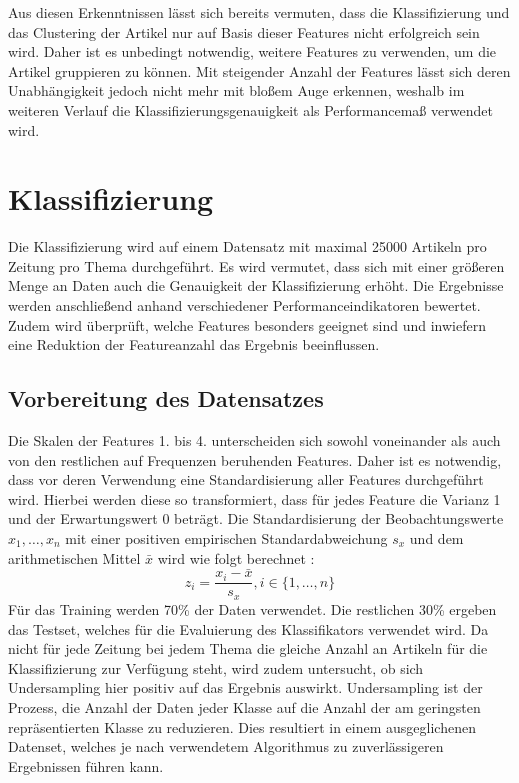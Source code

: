 Aus diesen Erkenntnissen lässt sich bereits vermuten, dass die Klassifizierung und das Clustering der Artikel nur auf Basis dieser Features nicht erfolgreich sein wird. Daher ist es unbedingt notwendig, weitere Features zu verwenden, um die Artikel gruppieren zu können. Mit steigender Anzahl der Features lässt sich deren Unabhängigkeit jedoch nicht mehr mit bloßem Auge erkennen, weshalb im weiteren Verlauf die Klassifizierungsgenauigkeit als Performancemaß verwendet wird.

\section{Klassifizierung}
Die Klassifizierung wird auf einem Datensatz mit maximal 25000 Artikeln pro Zeitung pro Thema durchgeführt. Es wird vermutet, dass sich mit einer größeren Menge an Daten auch die Genauigkeit der Klassifizierung erhöht. Die Ergebnisse werden anschließend anhand verschiedener Performanceindikatoren bewertet. Zudem wird überprüft, welche Features besonders geeignet sind und inwiefern eine Reduktion der Featureanzahl das Ergebnis beeinflussen.

\subsection{Vorbereitung des Datensatzes}
Die Skalen der Features 1. bis 4. unterscheiden sich sowohl voneinander als auch von den restlichen auf Frequenzen beruhenden Features. Daher ist es notwendig, dass vor deren Verwendung eine Standardisierung aller Features durchgeführt wird. Hierbei werden diese so transformiert, dass für jedes Feature die Varianz 1 und der Erwartungswert 0 beträgt. Die Standardisierung der Beobachtungswerte $x_1,\dots,x_n$ mit einer positiven empirischen Standardabweichung $s_x$ und dem arithmetischen Mittel $\bar{x}$ wird wie folgt berechnet \cite[S.~104]{burkschat2012beschreibende}:
\[ z_i = \frac{x_i-\bar{x}}{s_x}, i\in\{1,\dots,n\} \]
Für das Training werden 70\% der Daten verwendet. Die restlichen 30\% ergeben das Testset, welches für die Evaluierung des Klassifikators verwendet wird. Da nicht für jede Zeitung bei jedem Thema die gleiche Anzahl an Artikeln für die Klassifizierung zur Verfügung steht, wird zudem untersucht, ob sich Undersampling hier positiv auf das Ergebnis auswirkt. Undersampling ist der Prozess, die Anzahl der Daten jeder Klasse auf die Anzahl der am geringsten repräsentierten Klasse zu reduzieren. Dies resultiert in einem ausgeglichenen Datenset, welches je nach verwendetem Algorithmus zu zuverlässigeren Ergebnissen führen kann.

